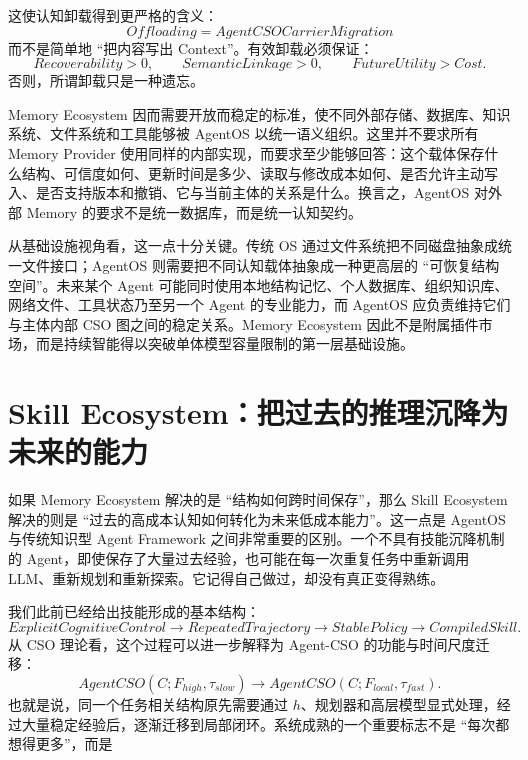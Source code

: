这使认知卸载得到更严格的含义：
\[
\boxed{
Offloading
=
AgentCSOCarrierMigration
}
\]
而不是简单地 ``把内容写出 Context''。有效卸载必须保证：
\[
Recoverability>0,\qquad
SemanticLinkage>0,\qquad
FutureUtility>Cost.
\]
否则，所谓卸载只是一种遗忘。

Memory Ecosystem 因而需要开放而稳定的标准，使不同外部存储、数据库、知识系统、文件系统和工具能够被 AgentOS 以统一语义组织。这里并不要求所有 Memory Provider 使用同样的内部实现，而要求至少能够回答：这个载体保存什么结构、可信度如何、更新时间是多少、读取与修改成本如何、是否允许主动写入、是否支持版本和撤销、它与当前主体的关系是什么。换言之，AgentOS 对外部 Memory 的要求不是统一数据库，而是统一认知契约。

从基础设施视角看，这一点十分关键。传统 OS 通过文件系统把不同磁盘抽象成统一文件接口；AgentOS 则需要把不同认知载体抽象成一种更高层的 ``可恢复结构空间''。未来某个 Agent 可能同时使用本地结构记忆、个人数据库、组织知识库、网络文件、工具状态乃至另一个 Agent 的专业能力，而 AgentOS 应负责维持它们与主体内部 CSO 图之间的稳定关系。Memory Ecosystem 因此不是附属插件市场，而是持续智能得以突破单体模型容量限制的第一层基础设施。

\section{Skill Ecosystem：把过去的推理沉降为未来的能力}

如果 Memory Ecosystem 解决的是 ``结构如何跨时间保存''，那么 Skill Ecosystem 解决的则是 ``过去的高成本认知如何转化为未来低成本能力''。这一点是 AgentOS 与传统知识型 Agent Framework 之间非常重要的区别。一个不具有技能沉降机制的 Agent，即使保存了大量过去经验，也可能在每一次重复任务中重新调用 LLM、重新规划和重新探索。它记得自己做过，却没有真正变得熟练。

我们此前已经给出技能形成的基本结构：
\[
ExplicitCognitiveControl
\rightarrow
RepeatedTrajectory
\rightarrow
StablePolicy
\rightarrow
CompiledSkill.
\]
从 CSO 理论看，这个过程可以进一步解释为 Agent-CSO 的功能与时间尺度迁移：
\[
AgentCSO(C;F_{high},\tau_{slow})
\rightarrow
AgentCSO(C;F_{local},\tau_{fast}).
\]
也就是说，同一个任务相关结构原先需要通过 $h$、规划器和高层模型显式处理，经过大量稳定经验后，逐渐迁移到局部闭环。系统成熟的一个重要标志不是 ``每次都想得更多''，而是
\begin{statementbox}
\centering
{}
\end{statementbox}

